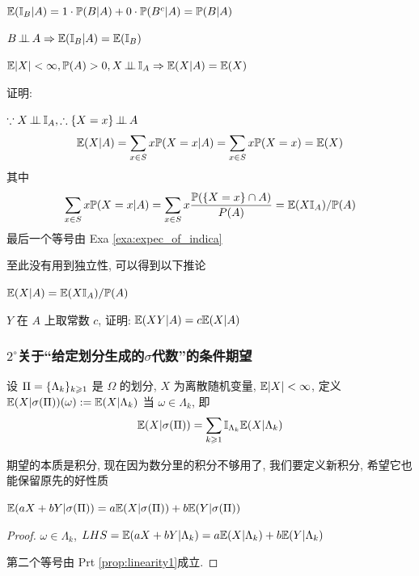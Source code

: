 \begin{example}
    $\mathbb E(\mathbb I_B|A)=1\cdot \mathbb{P}(B|A)+0\cdot \mathbb{P}(B^c|A)=\mathbb{P}(B|A)$
\end{example}

\begin{example}
    $B\operatorname{\perp\!\!\!\perp} A\Rightarrow \mathbb E(\mathbb I_B|A)=\mathbb E(\mathbb I_B)$
\end{example}

\begin{property}
$\mathbb E|X|<\infty, \mathbb{P}(A)>0, X\operatorname{\perp\!\!\!\perp} \mathbb I_A\Rightarrow \mathbb E(X|A)=\mathbb E(X)$
\end{property}

证明: 

$\because X\operatorname{\perp\!\!\!\perp} \mathbb I_A, \therefore \{X=x\}\operatorname{\perp\!\!\!\perp} A$
\[
\mathbb E(X|A)=\sum_{x\in S}x\mathbb{P}(X=x|A)=\sum_{x\in S}x\mathbb{P}(X=x)=\mathbb E(X)
\]
其中
\[
\sum_{x\in S}x\mathbb{P}(X=x|A)=\sum_{x\in S}x\frac{\mathbb{P}(\{X=x\}\cap A)}{P(A)}=\mathbb E(X\mathbb I_A)/\mathbb{P}(A)
\]
最后一个等号由 Exa \ref{exa:expec_of_indica}

至此没有用到独立性, 可以得到以下推论

\begin{corollary}\label{cor:con_exp_indic}
    $\mathbb E(X|A)=\mathbb E(X\mathbb I_A)/\mathbb{P}(A)$
\end{corollary}

\begin{problem}[作业2-1]
$Y$ 在 $A$ 上取常数 $c$, 证明: $\mathbb E(XY|A)=c\mathbb E(X|A)$
\end{problem}

\subsubsection*{$2^\circ$关于“给定划分生成的$\sigma$代数”的条件期望}

\begin{definition}\label{def:part_con_exp}
    设 $\Pi=\{{\Lambda}_{k}\}_{k \geqslant 1}$ 是 $\Omega$ 的划分, $X$ 为离散随机变量, $\mathbb E|X|<\infty$, 定义 $\mathbb E(X|\sigma(\Pi))(\omega):=\mathbb E(X|\Lambda_k)$ 当 $\omega\in \Lambda_k$, 即
    \[
    \mathbb E(X|\sigma(\Pi))=\sum_{k\geqslant 1}\mathbb I_{\Lambda_k}\mathbb E(X|\Lambda_k)
    \]
\end{definition}

期望的本质是积分, 现在因为数分里的积分不够用了, 我们要定义新积分, 希望它也能保留原先的好性质

\begin{property}[线性性]
$\mathbb E(aX+bY|\sigma(\Pi))=a\mathbb E(X|\sigma(\Pi))+b\mathbb E(Y|\sigma(\Pi))$
\end{property}

\begin{proof}
$\omega\in \Lambda_k$, $LHS=\mathbb E(aX+bY|\Lambda_k)=a\mathbb E(X|\Lambda_k)+b\mathbb E(Y|\Lambda_k)$

第二个等号由 Prt \ref{prop:linearity1}成立. 
\end{proof}

